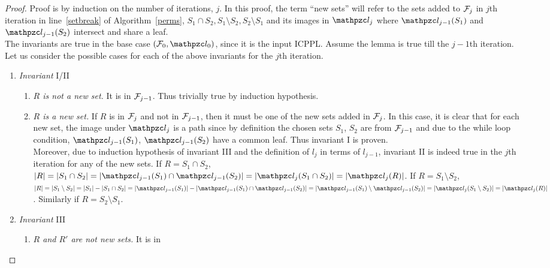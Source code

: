 \documentclass[MS]             %
              {iitmdiss_as}    %
\begin{document}
\begin{proof}
 Proof is by induction on the number of iterations, $j$. In this
  proof, the term ``new sets'' will refer to the sets added to ${\cal F}_j$
  in $j$th iteration in line~\ref{setbreak} of Algorithm~\ref{perms},
  $S_1 \cap S_2, S_1 \setminus S_2, S_2 \setminus S_1$ and its
  images in $\cl_j$ where $\cl_{j-1}(S_1)$
  and $\cl_{j-1}(S_2)$ intersect and share a leaf.\\
  The invariants are true in the base case $(\cF_0, \cl_0)$, since it
  is the input ICPPL.  Assume the lemma is true till the $j-1$th
  iteration. Let us consider the possible cases for each of the above invariants for
  the $j$th iteration.

  
 \begin{enumerate}[\xbullet]
  \item {\em Invariant} I/II
    \begin{enumerate}[{I/II}a $|$] %
    \item {\em $R$ is not a new set.} It is in ${\cal F}_{j-1}$. Thus
      trivially true by induction hypothesis.
    \item {\em $R$ is a new set.} If $R$ is in ${\cal F}_{j}$ and not in
      ${\cal F}_{j-1}$, then it must be one of the new sets added in
      ${\cal F}_j$. In this case, it is clear that for each new set, the
      image under $\cl_j$ is a path since by definition the chosen
      sets $S_1$, $S_2$ are from ${\cal F}_{j-1}$ and due to the while loop
      condition, $\cl_{j-1}(S_1)$, $\cl_{j-1}(S_2)$ have a
      common leaf. Thus invariant I is proven.\\
      Moreover, due to induction hypothesis of invariant III and the
      definition of $l_j$ in terms of $l_{j-1}$, invariant II is
      indeed true in the $j$th iteration for any of the new sets.  If
      $R = S_1 \cap S_2$, $|R| = |S_1 \cap S_2| = |\cl_{j-1}(S_1) \cap
      \cl_{j-1}(S_2)| = |\cl_j(S_1 \cap S_2)| = |\cl_j(R)|$.
      If $R = S_1 \setminus S_2$, $|R| = |S_1 \setminus S_2| = |S_1| -
      |S_1 \cap S_2| = |\cl_{j-1}(S_1)| - |\cl_{j-1}(S_1) \cap
      \cl_{j-1}(S_2)| = |\cl_{j-1}(S_1) \setminus \cl_{j-1}(S_2)| =
      |\cl_j(S_1 \setminus S_2)|
      = |\cl_j(R)|$. Similarly if $R = S_2 \setminus S_1$.\\
    \end{enumerate}
  \item {\em Invariant} III
    \begin{enumerate}[{III}a $|$]
    \item {\em $R$ and $R'$ are not new sets.} It is in

\end{enumerate}
\end{enumerate}
\end{proof}
\end{document}
